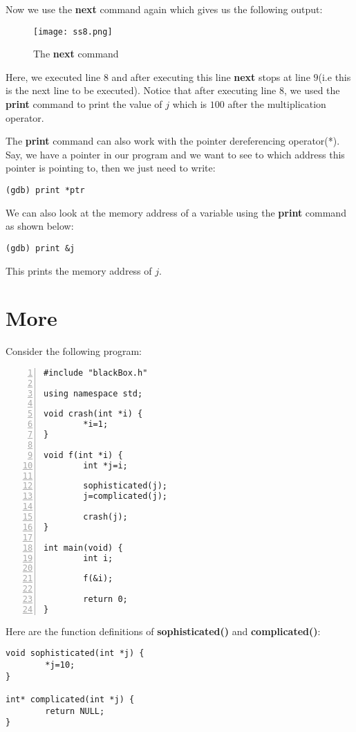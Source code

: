 \documentclass{article}
\makeatletter
\renewcommand\paragraph{\@startsection{paragraph}{4}{\z@}{-3.25ex \@plus -1ex \@minus -.2ex}{1.5ex \@plus .2ex}{\normalfont\normalsize\bfseries}}
\makeatother
\begin{document}
Now we use the \textbf{next} command again which gives us the following output:
\begin{figure}[h]
\centering
\texttt{[image: ss8.png]}
\caption{The \textbf{next} command}
\end{figure}

Here, we executed line $8$ and after executing this line \textbf{next} stops at line $9$(i.e this is the next line to be executed). Notice that after executing line $8$, we used the \textbf{print} command to print the value of $j$ which is $100$ after the multiplication operator.

The \textbf{print} command can also work with the pointer dereferencing operator(*). Say, we have a pointer in our program and we want to see to which address this pointer is pointing to, then we just need to write:
\begin{Verbatim}[frame=single]
(gdb) print *ptr
\end{Verbatim}

We can also look at the memory address of a variable using the \textbf{print} command as shown below:

\begin{Verbatim}[frame=single]
(gdb) print &j
\end{Verbatim}
This prints the memory address of $j$.
\newpage
\section{More}
\paragraph{}
Consider the following program:
\begin{Verbatim}[numbers=left, frame=single]
#include "blackBox.h"

using namespace std;

void crash(int *i) {
        *i=1;
}

void f(int *i) {
        int *j=i;

        sophisticated(j);
        j=complicated(j);

        crash(j);
}

int main(void) {
        int i;

        f(&i);

        return 0;
}
\end{Verbatim}
Here are the function definitions of \textbf{sophisticated()} and \textbf{complicated()}:
\begin{Verbatim}[frame=single]
void sophisticated(int *j) {
        *j=10;
}

int* complicated(int *j) {
        return NULL;
}
\end{Verbatim}
\end{document}
